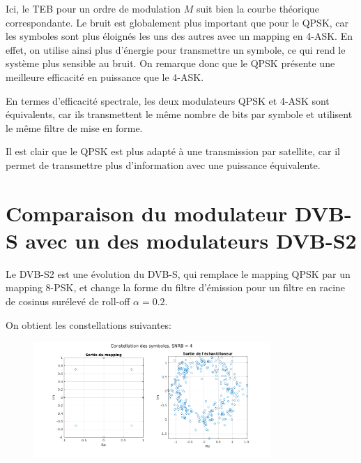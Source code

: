 \documentclass[a4paper, 12pt]{article}
\begin{document}
Ici, le TEB pour un ordre de modulation $M$ suit bien la courbe théorique
correspondante. Le bruit est globalement plus important que pour le QPSK, car
les symboles sont plus éloignés les uns des autres avec un mapping en 4-ASK. En
effet, on utilise ainsi plus d'énergie pour transmettre un symbole, ce qui rend
le système plus sensible au bruit. On remarque donc que le QPSK présente une
meilleure efficacité en puissance que le 4-ASK. \medbreak

En termes d'efficacité spectrale, les deux modulateurs QPSK et 4-ASK sont
équivalents, car ils transmettent le même nombre de bits par symbole et utilisent
le même filtre de mise en forme. \medbreak

Il est clair que le QPSK est plus adapté à une transmission par satellite, car
il permet de transmettre plus d'information avec une puissance équivalente. \medbreak

\clearpage
\section{Comparaison du modulateur DVB-S avec un des modulateurs DVB-S2}

Le DVB-S2 est une évolution du DVB-S, qui remplace le mapping QPSK par un
mapping 8-PSK, et change la forme du filtre d'émission pour un filtre en racine
de cosinus surélevé de roll-off $\alpha = 0.2$. \medbreak

On obtient les constellations suivantes:

\begin{figure}[H]
    \centering
    \includegraphics[trim=70 0 70 0, clip, width=0.8\textwidth]{graphics/4-1_4.png}
    \label{fig:constellation_dvbs2}
\end{figure}
\end{document}
